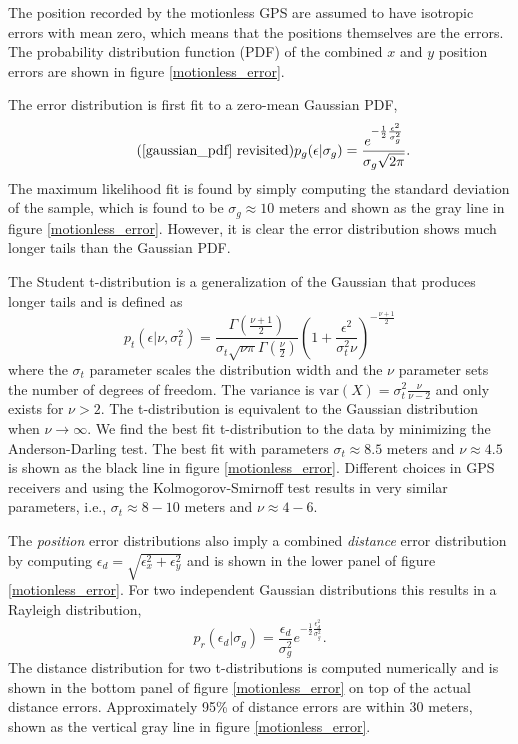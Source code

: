 \documentclass[10pt,journal]{IEEEtran}
\begin{document}
The position recorded by the motionless GPS are assumed to have isotropic errors with mean zero, which means that the positions themselves are the errors. The probability distribution function (PDF) of the combined $x$ and $y$ position errors are shown in figure \ref{motionless_error}.

The error distribution is first fit to a zero-mean Gaussian PDF,
\begin{equation}
\tag{\ref{gaussian_pdf} revisited}
p_g(\epsilon|\sigma_g) = \frac{e^{-\frac{1}{2}\frac{\epsilon^2}{\sigma_g^2}} }{\sigma_g \sqrt{ 2 \pi}}.
\end{equation}
The maximum likelihood fit is found by simply computing the standard deviation of the sample, which is found to be $\sigma_g \approx 10$ meters and shown as the gray line in figure \ref{motionless_error}. However, it is clear the error distribution shows much longer tails than the Gaussian PDF.

The Student t-distribution is a generalization of the Gaussian that produces longer tails and is defined as 
\begin{equation}
\label{student_pdf}
p_t\left(\epsilon |\nu,\sigma_t^2\right) = \frac{\Gamma\left( \frac{\nu + 1}{2} \right)}{\sigma_t \sqrt{\nu \pi} \Gamma\left(\frac{\nu}{2}\right)} \left( 1 + \frac{\epsilon^2}{\sigma_t^2 \nu} \right)^{-\frac{\nu+1}{2}}
\end{equation}
where the $\sigma_t$ parameter scales the distribution width and the $\nu$ parameter sets the number of degrees of freedom. The variance is $\textrm{var}(X)=\sigma_t^2 \frac{\nu}{\nu-2}$ and only exists for $\nu > 2$. The t-distribution is equivalent to the Gaussian distribution when $\nu \rightarrow \infty$. We find the best fit t-distribution to the data by minimizing the Anderson-Darling test. The best fit with parameters $\sigma_t \approx 8.5$ meters and $\nu \approx 4.5$ is shown as the black line in figure \ref{motionless_error}. Different choices in GPS receivers and using the Kolmogorov-Smirnoff test results in very similar parameters, i.e., $\sigma_t\approx8-10$ meters and $\nu\approx4-6$.

The \emph{position} error distributions also imply a combined \emph{distance} error distribution by computing $\epsilon_d = \sqrt{\epsilon_x^2 + \epsilon_y^2}$ and is shown in the lower panel of figure \ref{motionless_error}. For two independent Gaussian distributions this results in a Rayleigh distribution,
\begin{equation}
\label{rayleigh_pdf}
p_r(\epsilon_d|\sigma_g) = \frac{\epsilon_d}{\sigma_g^2 } e^{-\frac{1}{2}\frac{\epsilon_d^2}{\sigma_g^2}}.
\end{equation}
The distance distribution for two t-distributions is computed numerically and is shown in the bottom panel of figure \ref{motionless_error} on top of the actual distance errors. Approximately 95\% of distance errors are within $30$ meters, shown as the vertical gray line in figure \ref{motionless_error}.
\end{document}
